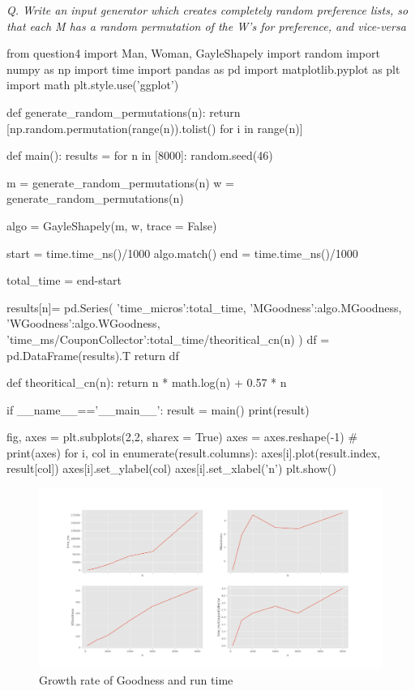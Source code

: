\documentclass{homeworg}
\begin{document}
\emph{Q. Write an input generator which creates completely random preference lists, so that each M has a random permutation of the W’s for preference, and vice-versa}
\begin{python}
from question4 import Man, Woman, GayleShapely
import random
import numpy as np
import time
import pandas as pd
import matplotlib.pyplot as plt
import math
plt.style.use('ggplot')

def generate_random_permutations(n):
    return [np.random.permutation(range(n)).tolist() for i in range(n)]

def main():
    results = {}
    for n in [8000]:
        random.seed(46)
        
        m = generate_random_permutations(n)
        w = generate_random_permutations(n)

        algo = GayleShapely(m, w, trace = False)
        
        start = time.time_ns()/1000
        algo.match()
        end = time.time_ns()/1000
        
        total_time = end-start
        
        results[n]= pd.Series({
                'time_micros':total_time,
                'MGoodness':algo.MGoodness,
                'WGoodness':algo.WGoodness,
                'time_ms/CouponCollector':total_time/theoritical_cn(n)
            })
    df =  pd.DataFrame(results).T
    return df

def theoritical_cn(n):
    return n * math.log(n) + 0.57 * n

if __name__=='__main__':
    result = main()
    print(result)

    fig, axes = plt.subplots(2,2, sharex = True)
    axes = axes.reshape(-1)
    # print(axes)
    for i, col in enumerate(result.columns):
        axes[i].plot(result.index, result[col])
        axes[i].set_ylabel(col)
        axes[i].set_xlabel('n')
    plt.show()
\end{python}

\begin{figure}[h]
    \centering
    \includegraphics[width=1\textwidth]{images/q5.png}
    \caption{Growth rate of Goodness and run time}
    \label{fig:q5}
\end{figure}
\end{document}
